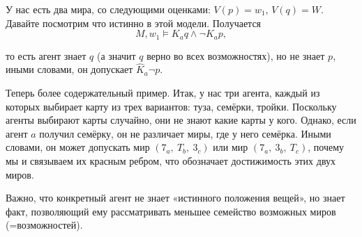 \documentclass[openany]{book}
\theoremstyle{plain}
\theoremstyle{definition}
\begin{document}
\begin{figure}[H]
    \centering
\end{figure}

У нас есть два мира, со следующими оценками: \(V(p) = {w_1}\), \(V(q) = W\). Давайте посмотрим что истинно в этой модели. Получается \[M, w_1 \models K_a q \land \neg K_a p,\]

то есть агент знает \(q\) (а значит \(q\) верно во всех возможностях), но не знает \(p\), иными словами, он допускает \(\hat{K}_a \neg p\).

Теперь более содержательный пример. Итак, у нас три агента, каждый из которых выбирает карту из трех вариантов: туза, семёрки, тройки. Поскольку агенты выбирают карты случайно, они не знают какие карты у кого. Однако, если агент \(a\) получил семёрку, он не различает миры, где у него семёрка. Иными словами, он может допускать мир \((7_a,\ T_b, \ 3_c)\) или мир \((7_a, \ 3_b, \ T_c)\), почему мы и связываем их красным ребром, что обозначает достижимость этих двух миров.

Важно, что конкретный агент не знает «истинного положения вещей», но знает факт, позволяющий ему рассматривать меньшее семейство возможных миров (=возможностей).
\end{document}
